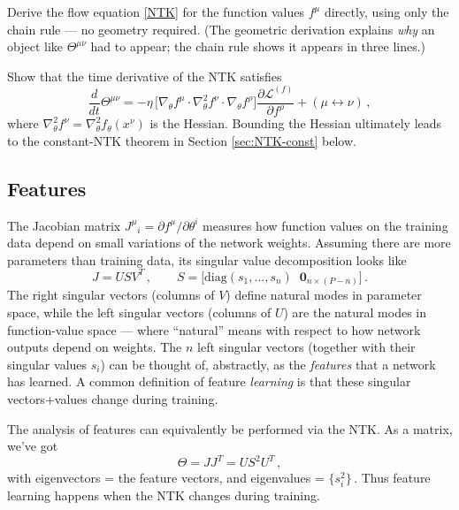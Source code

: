 \documentclass[11pt]{article}
\newcommand{\CL}{{\mathcal L}}
\newcommand{\pd}{\partial}
\begin{document}
\begin{exercise}
\label{ex:ntk-direct}
Derive the flow equation \eqref{NTK} for the function values $f^\mu$ directly, using only the chain rule --- no geometry required. (The geometric derivation explains \emph{why} an object like $\Theta^{\mu\nu}$ had to appear; the chain rule shows it appears in three lines.)
\end{exercise}

\begin{exercise}
\label{ex:ntk-dot}
Show that the time derivative of the NTK satisfies
%
\begin{equation}
    \frac{d}{dt} \Theta^{\mu\nu} = -\eta\,\big[ \nabla_\theta f^\mu \cdot \nabla_\theta^2 f^\nu \cdot \nabla_\theta f^\rho\big] \frac{\partial \CL^{(f)}}{\partial f^\rho} + (\mu\leftrightarrow\nu)\,,
\end{equation}
%
where $\nabla_\theta^2 f^\nu = \nabla_\theta^2 f_\theta(x^\nu)$ is the Hessian.
Bounding the Hessian ultimately leads to the constant-NTK theorem in Section \ref{sec:NTK-const} below.
\end{exercise}

\subsection{Features}
\label{sec:features}

The Jacobian matrix $J^\mu{}_i=\pd f^\mu/\pd \theta^i$ measures how function values on the training data depend on small variations of the network weights. Assuming there are more parameters than training data, its singular value decomposition looks like
%
\begin{equation} J = USV^T\,,\qquad S = \bigg[\text{diag}(s_1,...,s_n)\;\; \mathbf 0_{n\times (P-n)}\bigg]\,. \end{equation}
%
The right singular vectors (columns of $V$) define natural modes in parameter space, while the left singular vectors (columns of $U$) are the natural modes in function-value space --- where ``natural'' means with respect to how network outputs depend on weights.  The $n$ left singular vectors (together with their singular values $s_i$) can be thought of, abstractly, as the \emph{features} that a network has learned. A common definition of feature \emph{learning} is that these singular vectors+values change during training.

The analysis of features can equivalently be performed via the NTK. As a matrix, we've got
%
\begin{equation}
    \Theta = JJ^T = US^2U^T\,, \label{NTK-diag}
\end{equation}
%
with eigenvectors = the feature vectors, and eigenvalues = $\{s_i^2\}$\,. Thus feature learning happens when the NTK changes during training.
\end{document}

